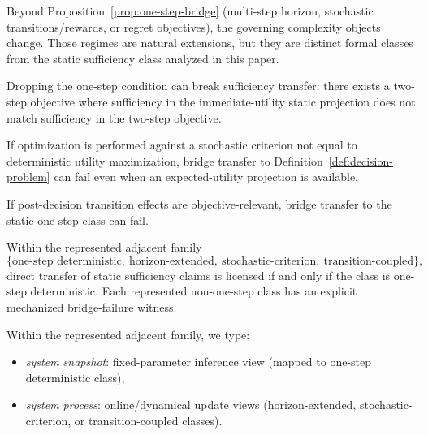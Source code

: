\begin{remark}
Beyond Proposition~\ref{prop:one-step-bridge} (multi-step horizon, stochastic transitions/rewards, or regret objectives), the governing complexity objects change. Those regimes are natural extensions, but they are distinct formal classes from the static sufficiency class analyzed in this paper.
\end{remark}

\begin{proposition}\label{prop:bridge-failure-horizon}
Dropping the one-step condition can break sufficiency transfer: there exists a two-step objective where sufficiency in the immediate-utility static projection does not match sufficiency in the two-step objective.
\end{proposition}

\begin{proposition}\label{prop:bridge-failure-stochastic}
If optimization is performed against a stochastic criterion not equal to deterministic utility maximization, bridge transfer to Definition~\ref{def:decision-problem} can fail even when an expected-utility projection is available.
\end{proposition}

\begin{proposition}\label{prop:bridge-failure-transition}
If post-decision transition effects are objective-relevant, bridge transfer to the static one-step class can fail.
\end{proposition}

\begin{theorem}\label{thm:bridge-boundary-represented}
Within the represented adjacent family
\[
\{\text{one-step deterministic},\ \text{horizon-extended},\ \text{stochastic-criterion},\ \text{transition-coupled}\},
\]
direct transfer of static sufficiency claims is licensed if and only if the class is one-step deterministic. Each represented non-one-step class has an explicit mechanized bridge-failure witness.
\end{theorem}

\begin{definition}\label{def:system-snapshot-process}
Within the represented adjacent family, we type:
\begin{itemize}
\item \emph{system snapshot}: fixed-parameter inference view (mapped to one-step deterministic class),
\item \emph{system process}: online/dynamical update views (horizon-extended, stochastic-criterion, or transition-coupled classes).
\end{itemize}
\end{definition}

